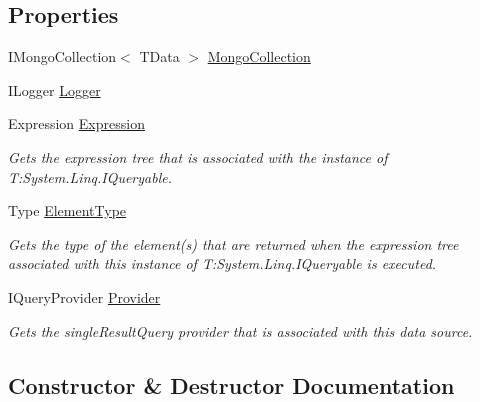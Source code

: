 \subsection*{Properties}
\begin{DoxyCompactItemize}
\item 
I\+Mongo\+Collection$<$ T\+Data $>$ \hyperlink{classCqrs_1_1MongoDB_1_1DataStores_1_1MongoDbDataStore_a116162a1c8e20706e99e850b0a9718cc}{Mongo\+Collection}
\item 
I\+Logger \hyperlink{classCqrs_1_1MongoDB_1_1DataStores_1_1MongoDbDataStore_a1258497689d7f866b2bc219cd8268b7d}{Logger}
\item 
Expression \hyperlink{classCqrs_1_1MongoDB_1_1DataStores_1_1MongoDbDataStore_ade387c1d511dfad22ff7eb752fb842e5}{Expression}
\begin{DoxyCompactList}\small\item\em Gets the expression tree that is associated with the instance of T\+:\+System.\+Linq.\+I\+Queryable. \end{DoxyCompactList}\item 
Type \hyperlink{classCqrs_1_1MongoDB_1_1DataStores_1_1MongoDbDataStore_a54f5798a67d64a47e6acb15f378fb246}{Element\+Type}
\begin{DoxyCompactList}\small\item\em Gets the type of the element(s) that are returned when the expression tree associated with this instance of T\+:\+System.\+Linq.\+I\+Queryable is executed. \end{DoxyCompactList}\item 
I\+Query\+Provider \hyperlink{classCqrs_1_1MongoDB_1_1DataStores_1_1MongoDbDataStore_ab08ce716944d76cbaef9a94fd1525440}{Provider}
\begin{DoxyCompactList}\small\item\em Gets the single\+Result\+Query provider that is associated with this data source. \end{DoxyCompactList}\end{DoxyCompactItemize}


\subsection{Constructor \& Destructor Documentation}
\mbox{\label{classCqrs_1_1MongoDB_1_1DataStores_1_1MongoDbDataStore_a039b75f6f011fa89b5dd724bee6b64cb}} 
